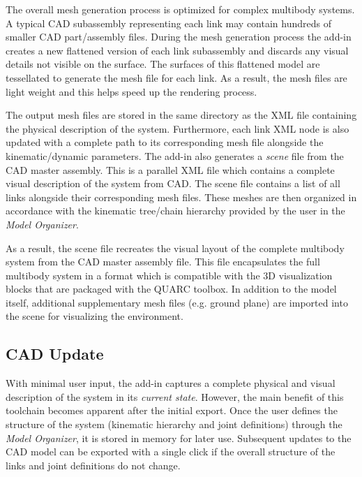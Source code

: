 The overall mesh generation process is optimized for complex multibody systems. A typical CAD subassembly representing each link may contain hundreds of smaller CAD part/assembly files. During the mesh generation process the add-in creates a new flattened version of each link subassembly and discards any visual details not visible on the surface. The surfaces of this flattened model are tessellated to generate the mesh file for each link. As a result, the mesh files are light weight and this helps speed up the rendering process.

The output mesh files are stored in the same directory as the XML file containing the physical description of the system. Furthermore, each link XML node is also updated with a complete path to its corresponding mesh file alongside the kinematic/dynamic parameters. The add-in also generates a \emph{scene} file from the CAD master assembly. This is a parallel XML file which contains a complete visual description of the system from CAD. The scene file contains a list of all links alongside their corresponding mesh files. These meshes are then organized in accordance with the kinematic tree/chain hierarchy provided by the user in the \emph{Model Organizer}.

As a result, the scene file recreates the visual layout of the complete multibody system from the CAD master assembly file. This file encapsulates the full multibody system in a format which is compatible with the 3D visualization blocks that are packaged with the QUARC toolbox. In addition to the model itself, additional supplementary mesh files (e.g. ground plane) are imported into the scene for visualizing the environment.

\subsection{CAD Update} %
\label{sub:cad_update}
With minimal user input, the add-in captures a complete physical and visual description of the system in its \emph{current state}. However, the main benefit of this toolchain becomes apparent after the initial export. Once the user defines the structure of the system (kinematic hierarchy and joint definitions) through the \emph{Model Organizer}, it is stored in memory for later use. Subsequent updates to the CAD model can be exported with a single click if the overall structure of the links and joint definitions do not change.

